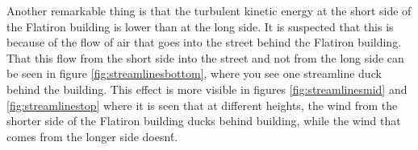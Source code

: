 \indent %
Another remarkable thing is that the turbulent kinetic energy at the short side of the Flatiron building is lower than at the long side. It is suspected that this is because of the flow of air that goes into the street behind the Flatiron building. That this flow from the short side into the street and not from the long side can be seen in figure \ref{fig:streamlinesbottom}, where you see one streamline duck behind the building. This effect is more visible in figures \ref{fig:streamlinesmid} and \ref{fig:streamlinestop} where it is seen that at different heights, the wind from the shorter side of the Flatiron building ducks behind building, while the wind that comes from the longer side doesn\'t. 
